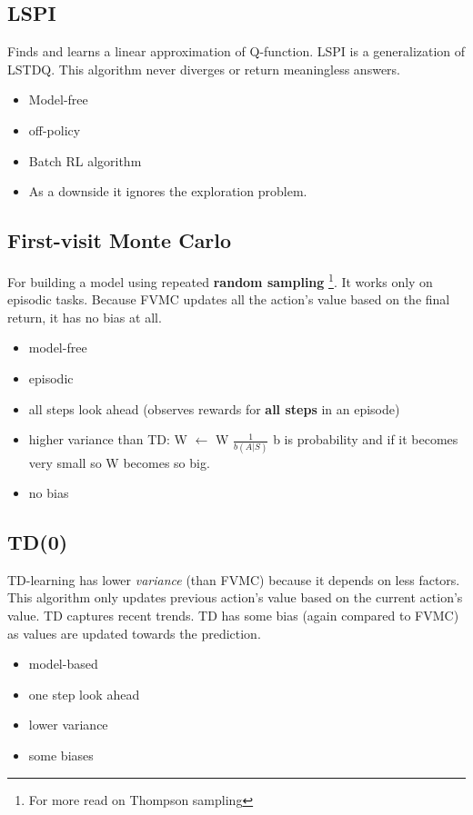 \documentclass[a4paper,12pt]{article}
\begin{document}
\subsection{LSPI}
Finds and learns a linear approximation of Q-function. LSPI is a generalization of LSTDQ. This algorithm never diverges or return meaningless answers.

\begin{itemize}
    \item Model-free \cite{Lagoudakis2003}
    \item off-policy
    \item Batch RL algorithm
    \item As a downside it ignores the exploration problem.
\end{itemize}

\subsection{First-visit Monte Carlo}
For building a model using repeated \textbf{random sampling} \footnote{For more read on Thompson sampling}. It works only on episodic tasks. Because FVMC updates all the action's value based on the final return, it has no bias at all.
\begin{itemize}
    \item model-free
    \item episodic
    \item  all steps look ahead (observes rewards for \textbf{all steps} in an episode)
    \item higher variance than TD: W $\leftarrow$ W $\frac{1}{b(A|S)}$ b is probability and if it becomes very small so W becomes so big.
    \item no bias
\end{itemize}

\subsection{TD(0)}
TD-learning has lower \textit{variance} (than FVMC) because it depends on less factors. This algorithm only updates previous action's value based on the current action's value. TD captures recent trends. TD has some bias (again compared to FVMC) as values are updated towards the prediction.
\begin{itemize}
    \item model-based
    \item one step look ahead
    \item lower variance
    \item some biases
\end{itemize}
\end{document}
